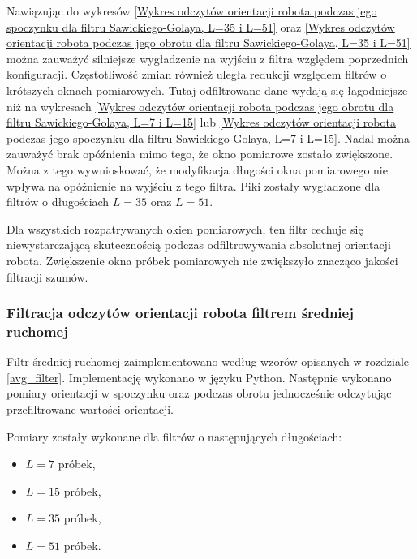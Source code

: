 {{{        Nawiązując do wykresów \ref{Wykres odczytów orientacji robota podczas jego spoczynku dla filtru Sawickiego-Golaya, L=35 i L=51} oraz \ref{Wykres odczytów orientacji robota podczas jego obrotu dla filtru Sawickiego-Golaya, L=35 i L=51} można zauważyć silniejsze wygładzenie na wyjściu z filtra względem poprzednich konfiguracji. Częstotliwość zmian również uległa redukcji względem filtrów o krótszych oknach pomiarowych. Tutaj odfiltrowane dane wydają się łagodniejsze niż na wykresach \ref{Wykres odczytów orientacji robota podczas jego obrotu dla filtru Sawickiego-Golaya,
        L=7 i L=15} lub \ref{Wykres odczytów orientacji robota podczas jego spoczynku dla filtru Sawickiego-Golaya, L=7 i L=15}. Nadal można zauważyć brak opóźnienia mimo tego, że okno pomiarowe zostało zwiększone. Można z tego wywnioskować, że modyfikacja długości okna pomiarowego nie wpływa na opóźnienie na wyjściu z tego filtra. Piki zostały  wygładzone dla filtrów o długościach $L=35$ oraz $L=51$.
       
        Dla wszystkich rozpatrywanych okien pomiarowych, ten filtr cechuje się niewystarczającą skutecznością podczas odfiltrowywania absolutnej orientacji robota. Zwiększenie okna próbek pomiarowych nie zwiększyło znacząco jakości filtracji szumów.
        }
        
        \subsubsection{Filtracja odczytów orientacji robota filtrem średniej ruchomej}\label{av_filter}
        {
            Filtr średniej ruchomej zaimplementowano według wzorów opisanych w rozdziale \ref{avg_filter}. Implementację wykonano w języku Python. Następnie wykonano pomiary orientacji w spoczynku oraz podczas obrotu jednocześnie odczytując przefiltrowane wartości orientacji. 
            
            Pomiary zostały wykonane dla filtrów o następujących długościach:
            
            \begin{center}
                \begin{itemize}
                    \item $L=7$ próbek,
                    \item $L=15$ próbek,
                    \item $L=35$ próbek,
                    \item $L=51$ próbek.
                \end{itemize}
            \end{center}
            
}}}
